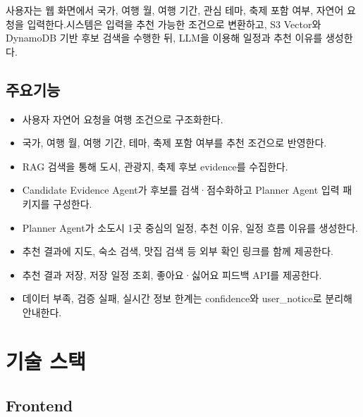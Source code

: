 \documentclass[12pt,a4paper]{article}
\newcommand{\DocNeedspace}[1]{\par\ifdim\dimexpr\pagegoal-\pagetotal\relax<#1\newpage\fi}
\begin{document}
\DocNeedspace{3\baselineskip}
사용자는 웹 화면에서 국가, 여행 월, 여행 기간, 관심 테마, 축제 포함 여부, 자연어 요청을 입력한다.\newline 시스템은 입력을 추천 가능한 조건으로 변환하고, S3 Vector와 DynamoDB 기반 후보 검색을 수행한 뒤, LLM을 이용해 일정과 추천 이유를 생성한다.


\DocNeedspace{24\baselineskip}
\subsection*{주요기능}


\begin{itemize}
\item 사용자 자연어 요청을 여행 조건으로 구조화한다.
\item 국가, 여행 월, 여행 기간, 테마, 축제 포함 여부를 추천 조건으로 반영한다.
\item RAG 검색을 통해 도시, 관광지, 축제 후보 evidence를 수집한다.
\item Candidate Evidence Agent가 후보를 검색·점수화하고 Planner Agent 입력 패키지를 구성한다.
\item Planner Agent가 소도시 1곳 중심의 일정, 추천 이유, 일정 흐름 이유를 생성한다.
\item 추천 결과에 지도, 숙소 검색, 맛집 검색 등 외부 확인 링크를 함께 제공한다.
\item 추천 결과 저장, 저장 일정 조회, 좋아요·싫어요 피드백 API를 제공한다.
\item 데이터 부족, 검증 실패, 실시간 정보 한계는 confidence와 user\_notice로 분리해 안내한다.
\end{itemize}


\newpage

\DocNeedspace{10\baselineskip}
\section*{기술 스택}


\DocNeedspace{8\baselineskip}
\subsection*{Frontend}
\end{document}
